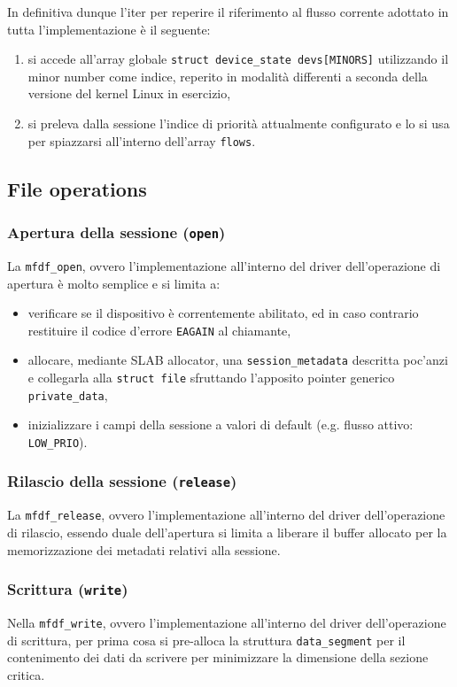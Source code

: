 \documentclass{article}
\begin{document}
In definitiva dunque l'iter per reperire il riferimento al flusso corrente adottato in tutta l'implementazione è il seguente:
\begin{enumerate}
        \item si accede all'array globale \texttt{struct device\_state devs[MINORS]} utilizzando il minor number come indice, reperito in modalità differenti a seconda della versione del kernel Linux in esercizio,
        \item si preleva dalla sessione l'indice di priorità attualmente configurato e lo si usa per spiazzarsi all'interno dell'array \texttt{flows}.
\end{enumerate}

\subsection{File operations}
\subsubsection{Apertura della sessione (\texttt{open})}
La \texttt{mfdf\_open}, ovvero l'implementazione all'interno del driver dell'operazione di apertura è molto semplice e si limita a:
\begin{itemize}
        \item verificare se il dispositivo è correntemente abilitato, ed in caso contrario restituire il codice d'errore \texttt{EAGAIN} al chiamante,
        \item allocare, mediante SLAB allocator, una \texttt{session\_metadata} descritta poc'anzi e collegarla alla \texttt{struct file} sfruttando l'apposito pointer generico \texttt{private\_data},
        \item inizializzare i campi della sessione a valori di default (e.g. flusso attivo: \texttt{LOW\_PRIO}).
\end{itemize}

\subsubsection{Rilascio della sessione (\texttt{release})}
La \texttt{mfdf\_release}, ovvero l'implementazione all'interno del driver dell'operazione di rilascio, essendo duale dell'apertura si limita a liberare il buffer allocato per la memorizzazione dei metadati relativi alla sessione.

\subsubsection{Scrittura (\texttt{write})}
Nella \texttt{mfdf\_write}, ovvero l'implementazione all'interno del driver dell'operazione di scrittura, per prima cosa si pre-alloca la struttura \texttt{data\_segment} per il contenimento dei dati da scrivere per minimizzare la dimensione della sezione critica.
\end{document}
